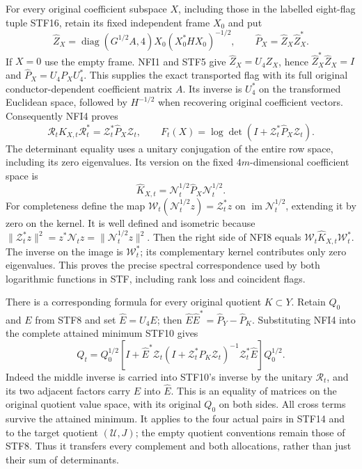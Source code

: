 For every original coefficient subspace $X$, including those in the
labelled eight-flag tuple STF16, retain its fixed independent frame $X_0$
and put
\[
 \widehat Z_X=
  \operatorname{diag}(G^{1/2}A,4)X_0(X_0^*HX_0)^{-1/2},
 \qquad \widehat P_X=\widehat Z_X\widehat Z_X^*.
                                                               \tag{NFI7}
\]
If $X=0$ use the empty frame. NFI1 and STF5 give
$\widehat Z_X=U_4Z_X$, hence
$\widehat Z_X^*\widehat Z_X=I$ and
$\widehat P_X=U_4P_XU_4^*$. This supplies the exact transported
flag with its full original conductor-dependent coefficient matrix
$A$. Its inverse is $U_4^*$ on the transformed Euclidean space,
followed by $H^{-1/2}$ when recovering original coefficient vectors.
Consequently NFI4 proves
\[
 \mathscr R_tK_{X,t}\mathscr R_t^*
       =\mathscr Z_t^*\widehat P_X\mathscr Z_t,
 \qquad
 F_t(X)=\log\det(I+\mathscr Z_t^*\widehat P_X\mathscr Z_t).
                                                               \tag{NFI8}
\]
The determinant equality uses a unitary conjugation of the entire
row space, including its zero eigenvalues. Its version on the fixed
$4m$-dimensional coefficient space is
\[
 \widehat K_{X,t}=\mathscr N_t^{1/2}\widehat P_X
                                  \mathscr N_t^{1/2}.
                                                               \tag{NFI9}
\]
For completeness define the map
$\mathcal W_t(\mathscr N_t^{1/2}z)=\mathscr Z_t^*z$ on
$\operatorname{im}\mathscr N_t^{1/2}$, extending it by zero on
the kernel. It is well defined and isometric because
$\|\mathscr Z_t^*z\|^2=z^*\mathscr N_tz
=\|\mathscr N_t^{1/2}z\|^2$.
Then the right side of NFI8 equals
$\mathcal W_t\widehat K_{X,t}\mathcal W_t^*$.
The inverse on the image is $\mathcal W_t^*$; its complementary
kernel contributes only zero eigenvalues. This proves the precise
spectral correspondence used by both logarithmic functions in STF,
including rank loss and coincident flags.

There is a corresponding formula for every original quotient
$K\subset Y$. Retain $Q_0$ and $E$ from STF8 and set
$\widehat E=U_4E$; then
$\widehat E\widehat E^*=\widehat P_Y-\widehat P_K$.
Substituting NFI4 into the complete attained minimum STF10 gives
\[
 Q_t=Q_0^{1/2}\left[I+
 \widehat E^*\mathscr Z_t
 (I+\mathscr Z_t^*\widehat P_K\mathscr Z_t)^{-1}
 \mathscr Z_t^*\widehat E\right]Q_0^{1/2}.
                                                               \tag{NFI10}
\]
Indeed the middle inverse is carried into STF10's inverse by the
unitary $\mathscr R_t$, and its two adjacent factors carry
$E$ into $\widehat E$. This is an equality of matrices on the
original quotient value space, with its original $Q_0$ on both
sides. All cross terms survive the attained minimum. It applies
to the four actual pairs in STF14 and to the target quotient
$(\mathcal U,J)$; the empty quotient conventions remain those
of STF8. Thus it transfers every complement and both allocations,
rather than just their sum of determinants.

